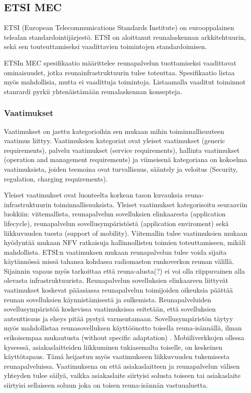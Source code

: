 \subsection{ETSI MEC} 
ETSI (European Telecommunications Standards Institute) on eurooppalainen telealan standardointijärjestö.
ETSI on aloittanut reunalaskennan arkkitehtuurin, sekä sen touteuttamiseksi vaadittavien toimintojen standardoimisen.

ETSIn MEC spesifikaatio määrittelee reunapalvelun tuottamiseksi vaadittavat ominaisuudet, jotka reunainfrastruktuurin tulee toteuttaa.
Spesifikaatio listaa myös mahdollisia, mutta ei vaadittuja toimintoja. 
Listaamalla vaaditut toiminnot stanrardi pyrkii yhtenäistämään reunalaskennan konsepteja.  

\subsubsection{Vaatimukset} \label{etsi}
Vaatimukset on jaettu kategorioihin sen mukaan mihin toiminnallisuuteen vaatimus liittyy.
Vaatimuksien kategoriat ovat yleiset vaatimukset (generic requirements), palvelu vaatimukset (service requirements), hallinta vaatimukset (operation and management requirements) ja viimeisenä kategoriana on kokoelma vaatimuksista, joiden teemoina ovat turvallisuus, sääntely ja veloitus (Security, regulation, charging requirements)\cite{etsitechreq}. 

Yleiset vaatimukset ovat luonteelta korkean tason kuvauksia reuna-infrastruktuurin toiminnallisuuksista. Yleiset vaatimukset kategorisoitu seuraaviin luokkiin: viitemallista, reunapalvelun sovelluksien elinkaaresta (application lifecycle),
reunapalvelun sovellusympäristöstä (application enviroment) sekä liikkuvuuden tuesta (support of mobility).
Viitemallin tulee vaatimuksien mukaan hyödyntää mukaan NFV ratkaisuja hallinnollisten toimien toteuttamiseen, mikäli mahdollista. 
ETSI:n vaatimuksen mukaan reunapalvelun tulee voida sijaita käytännössä missä tahansa kohdassa radiomaston runkoverkon reunan välillä. Sijainnin vapaus myös tarkoittaa että reuna-alusta(?) ei voi olla riippuvainen alla olevasta infrastruktuurista. 
Reunapalvelun sovelluksien elinkaareen liittyvät vaatimukset koskevat pääasiassa reunapalvelun toimijoiden oikeuksia päättää reunan sovelluksien käynnistämisestä ja sulkemista.
Reunapalveluiden sovellusympäristöä koskevissa vaatimuksissa esitetään, että sovelluksien autenttisuus ja eheys pitää pystyä varmentamaan. Sovellusympäristön täytyy myös mahdollistaa reunasovelluksen käyttöönotto toisella reuna-isännällä, ilman erikoisempaa mukautusta (without specific adaptation) \cite{etsitechreq}.
Mobiiliverkkojen ollessa kyseessä, asiakaslaitteiden liikkuminen tukiasemalta toiselle, on keskeinen käyttötapaus. Tämä heijastuu myös vaatimukseen liikkuvuuden tukemisesta reunapalveluissa.
Vaatimuksena on että asiakaslaitteen ja reunapalvelun välisen yhteyden tulee säilyä, vaikka asiakaslaite siirtyisi solusta toiseen tai asiakaslaite siirtyisi sellaiseen soluun joka on toisen reuna-isännän vastuualuetta.

